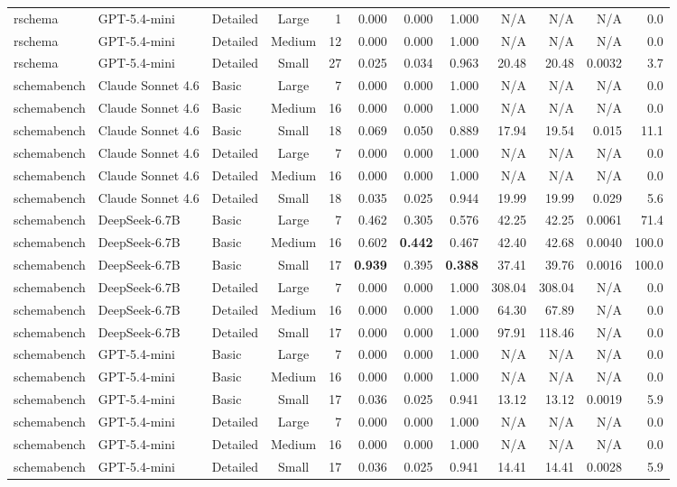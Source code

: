\begin{table}[t]
\begin{tabular}{lllcrrrrrrrr}
rschema & GPT-5.4-mini & Detailed & Large & 1 & 0.000 & 0.000 & 1.000 & N/A & N/A & N/A & 0.0 \\
rschema & GPT-5.4-mini & Detailed & Medium & 12 & 0.000 & 0.000 & 1.000 & N/A & N/A & N/A & 0.0 \\
rschema & GPT-5.4-mini & Detailed & Small & 27 & 0.025 & 0.034 & 0.963 & 20.48 & 20.48 & 0.0032 & 3.7 \\
\midrule
schemabench & Claude Sonnet 4.6 & Basic & Large & 7 & 0.000 & 0.000 & 1.000 & N/A & N/A & N/A & 0.0 \\
schemabench & Claude Sonnet 4.6 & Basic & Medium & 16 & 0.000 & 0.000 & 1.000 & N/A & N/A & N/A & 0.0 \\
schemabench & Claude Sonnet 4.6 & Basic & Small & 18 & 0.069 & 0.050 & 0.889 & 17.94 & 19.54 & 0.015 & 11.1 \\
schemabench & Claude Sonnet 4.6 & Detailed & Large & 7 & 0.000 & 0.000 & 1.000 & N/A & N/A & N/A & 0.0 \\
schemabench & Claude Sonnet 4.6 & Detailed & Medium & 16 & 0.000 & 0.000 & 1.000 & N/A & N/A & N/A & 0.0 \\
schemabench & Claude Sonnet 4.6 & Detailed & Small & 18 & 0.035 & 0.025 & 0.944 & 19.99 & 19.99 & 0.029 & 5.6 \\
schemabench & DeepSeek-6.7B & Basic & Large & 7 & 0.462 & 0.305 & 0.576 & 42.25 & 42.25 & 0.0061 & 71.4 \\
schemabench & DeepSeek-6.7B & Basic & Medium & 16 & 0.602 & \textbf{0.442} & 0.467 & 42.40 & 42.68 & 0.0040 & 100.0 \\
schemabench & DeepSeek-6.7B & Basic & Small & 17 & \textbf{0.939} & 0.395 & \textbf{0.388} & 37.41 & 39.76 & 0.0016 & 100.0 \\
schemabench & DeepSeek-6.7B & Detailed & Large & 7 & 0.000 & 0.000 & 1.000 & 308.04 & 308.04 & N/A & 0.0 \\
schemabench & DeepSeek-6.7B & Detailed & Medium & 16 & 0.000 & 0.000 & 1.000 & 64.30 & 67.89 & N/A & 0.0 \\
schemabench & DeepSeek-6.7B & Detailed & Small & 17 & 0.000 & 0.000 & 1.000 & 97.91 & 118.46 & N/A & 0.0 \\
schemabench & GPT-5.4-mini & Basic & Large & 7 & 0.000 & 0.000 & 1.000 & N/A & N/A & N/A & 0.0 \\
schemabench & GPT-5.4-mini & Basic & Medium & 16 & 0.000 & 0.000 & 1.000 & N/A & N/A & N/A & 0.0 \\
schemabench & GPT-5.4-mini & Basic & Small & 17 & 0.036 & 0.025 & 0.941 & 13.12 & 13.12 & 0.0019 & 5.9 \\
schemabench & GPT-5.4-mini & Detailed & Large & 7 & 0.000 & 0.000 & 1.000 & N/A & N/A & N/A & 0.0 \\
schemabench & GPT-5.4-mini & Detailed & Medium & 16 & 0.000 & 0.000 & 1.000 & N/A & N/A & N/A & 0.0 \\
schemabench & GPT-5.4-mini & Detailed & Small & 17 & 0.036 & 0.025 & 0.941 & 14.41 & 14.41 & 0.0028 & 5.9 \\
\bottomrule
\end{tabular}
\end{table}

